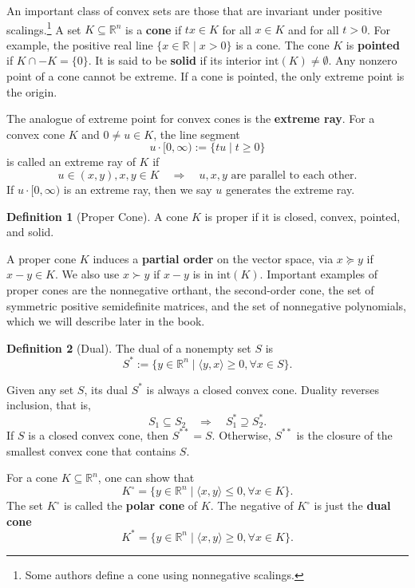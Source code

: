 \documentclass[
]{book}
\theoremstyle{definition}
\newtheorem{definition}{Definition}[chapter]
\theoremstyle{definition}
\theoremstyle{definition}
\theoremstyle{definition}
\theoremstyle{remark}
\begin{document}
An important class of convex sets are those that are invariant under positive scalings.\footnote{Some authors define a cone using nonnegative scalings.} A set \(K \subseteq \mathbb{R}^{n}\) is a \textbf{cone} if \(t x \in K\) for all \(x \in K\) and for all \(t > 0\). For example, the positive real line \(\{ x \in \mathbb{R}^{} \mid x > 0 \}\) is a cone. The cone \(K\) is \textbf{pointed} if \(K \cap -K = \{ 0 \}\). It is said to be \textbf{solid} if its interior \(\mathrm{int}(K) \neq \emptyset\). Any nonzero point of a cone cannot be extreme. If a cone is pointed, the only extreme point is the origin.

The analogue of extreme point for convex cones is the \textbf{extreme ray}. For a convex cone \(K\) and \(0 \neq u \in K\), the line segment
\[
u \cdot [0,\infty) := \{ tu \mid t\geq 0 \}
\]
is called an extreme ray of \(K\) if
\[
u \in (x,y), x,y \in K \quad \Rightarrow \quad u,x,y \text{ are parallel to each other}.
\]
If \(u \cdot [0,\infty)\) is an extreme ray, then we say \(u\) generates the extreme ray.

\begin{definition}[Proper Cone]
\protect\hypertarget{def:ProperCone}{}\label{def:ProperCone}A cone \(K\) is proper if it is closed, convex, pointed, and solid.
\end{definition}

A proper cone \(K\) induces a \textbf{partial order} on the vector space, via \(x \succeq y\) if \(x - y \in K\). We also use \(x \succ y\) if \(x - y\) is in \(\mathrm{int}(K)\). Important examples of proper cones are the nonnegative orthant, the second-order cone, the set of symmetric positive semidefinite matrices, and the set of nonnegative polynomials, which we will describe later in the book.

\begin{definition}[Dual]
\protect\hypertarget{def:Dual}{}\label{def:Dual}The dual of a nonempty set \(S\) is
\[
S^* := \{  y \in \mathbb{R}^{n} \mid \langle y, x \rangle \geq 0, \forall x \in S \}.
\]
\end{definition}

Given any set \(S\), its dual \(S^*\) is always a closed convex cone. Duality reverses inclusion, that is,
\[
S_1 \subseteq S_2 \quad \Rightarrow \quad S_1^* \supseteq S_2^*.
\]
If \(S\) is a closed convex cone, then \(S^{* *}= S\). Otherwise, \(S^{* *}\) is the closure of the smallest convex cone that contains \(S\).

For a cone \(K \subseteq \mathbb{R}^{n}\), one can show that
\[
K^\circ = \{ y \in \mathbb{R}^{n} \mid \langle x, y \rangle \leq 0, \forall x \in K \}.
\]
The set \(K^\circ\) is called the \textbf{polar cone} of \(K\). The negative of \(K^\circ\) is just the \textbf{dual cone}
\[
K^{*} = \{ y \in \mathbb{R}^{n} \mid \langle x, y \rangle \geq 0, \forall x \in K \}.
\]
\end{document}
